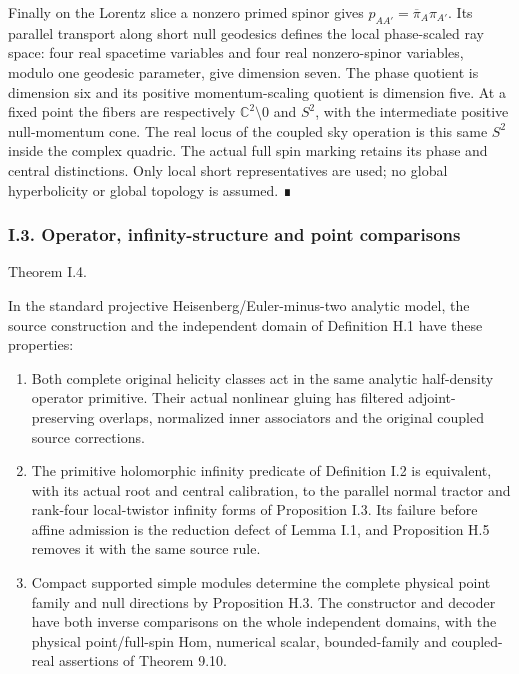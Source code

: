 \documentclass[
  english,
  11pt,
  reqno]{amsart}
\makeatletter
\providecommand{\tightlist}{%
  \setlength{\itemsep}{0pt}\setlength{\parskip}{0pt}}
\newcommand{\pandocstatementheading}[1]{%
  \par\addpenalty{\@beginparpenalty}%
  \addvspace{.5\baselineskip plus .2\baselineskip minus .2\baselineskip}%
  {\normalfont\bfseries #1\par}%
  \nobreak\@afterindenttrue\@afterheading
}
\makeatother
\begin{document}
Finally on the Lorentz slice a nonzero primed spinor gives
\(p_{AA'}=\overline\pi_A\pi_{A'}\). Its parallel transport along short
null geodesics defines the local phase-scaled ray space: four real
spacetime variables and four real nonzero-spinor variables, modulo one
geodesic parameter, give dimension seven. The phase quotient is
dimension six and its positive momentum-scaling quotient is dimension
five. At a fixed point the fibers are respectively
\(\mathbb C^2\setminus0\) and \(S^2\), with the intermediate positive
null-momentum cone. The real locus of the coupled sky operation is this
same \(S^2\) inside the complex quadric. The actual full spin marking
retains its phase and central distinctions. Only local short
representatives are used; no global hyperbolicity or global topology is
assumed. ∎

\protect{}\label{sec:gg-positive-original-adequacy}

\subsubsection{I.3. Operator, infinity-structure and point
comparisons}\label{i.3.-operator-infinity-structure-and-point-comparisons}

\pandocstatementheading{\protect{}\label{thm:gg-positive-original-adequacy}

\protect\phantomsection\label{thm:gg-primitive-infinity-point-structure}Theorem I.4.}

In the standard projective Heisenberg/Euler-minus-two analytic model,
the source construction and the independent domain of Definition H.1
have these properties:

\begin{enumerate}
\tightlist
\item
  Both complete original helicity classes act in the same analytic
  half-density operator primitive. Their actual nonlinear gluing has
  filtered adjoint-preserving overlaps, normalized inner associators and
  the original coupled source corrections.
\item
  The primitive holomorphic infinity predicate of Definition I.2 is
  equivalent, with its actual root and central calibration, to the
  parallel normal tractor and rank-four local-twistor infinity forms of
  Proposition I.3. Its failure before affine admission is the reduction
  defect of Lemma I.1, and Proposition H.5 removes it with the same
  source rule.
\item
  Compact supported simple modules determine the complete physical point
  family and null directions by Proposition H.3. The constructor and
  decoder have both inverse comparisons on the whole independent
  domains, with the physical point/full-spin Hom, numerical scalar,
  bounded-family and coupled-real assertions of Theorem 9.10.
\end{enumerate}
\end{document}

